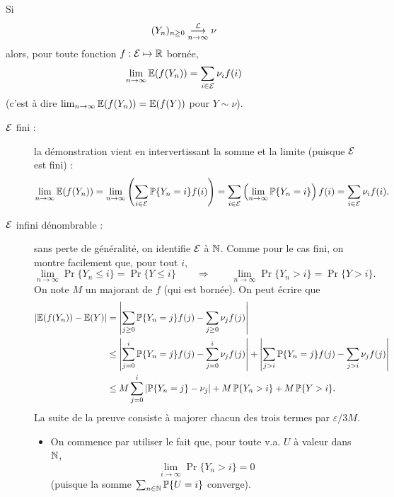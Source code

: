 \begin{proposition} \label{prop:convergenceEsperance}
  Si
  $$
  (Y_n)_{n \geq 0} \overset{\mathcal{L}}{\underset{n \to \infty}{\longrightarrow}} \nu
  $$
  alors, pour toute fonction $f : \mathcal{E} \mapsto \mathbb{R}$ bornée, 
  $$
  \lim_{n \to \infty} \operatorname{\mathbb{E}}(f(Y_n)) = \sum_{i \in \mathcal{E}} \nu_i f(i)
  $$
  (c'est à dire $\lim_{n \to \infty} \operatorname{\mathbb{E}}(f(Y_n)) = \operatorname{\mathbb{E}}(f(Y))$ pour $Y \sim \nu$).
\end{proposition}

\proof 
\begin{description}
  \item[$\mathcal{E}$ fini :] la démonstration vient en intervertissant la somme et la limite (puisque $\mathcal{E}$ est fini) : 
  $$
  \lim_{n \to \infty} \operatorname{\mathbb{E}}(f(Y_n)) 
  = \lim_{n \to \infty} \left(\sum_{i \in \mathcal{E}} \operatorname{\mathbb{P}}\{Y_n = i\} f(i)\right)
  = \sum_{i \in \mathcal{E}} \left(\lim_{n \to \infty} \operatorname{\mathbb{P}}\{Y_n = i\} \right) f(i) 
  = \sum_{i \in \mathcal{E}} \nu_i f(i).
  $$
  \item[$\mathcal{E}$ infini dénombrable :] sans perte de généralité, on identifie $\mathcal{E}$ à $\mathbb{N}$. Comme pour le cas fini, on montre facilement que, pour tout $i$,
  $$
  \lim_{n \to \infty} \Pr\{Y_n \leq i\} = \Pr\{Y \leq i\}
  \qquad \Rightarrow \qquad 
  \lim_{n \to \infty} \Pr\{Y_n > i\} = \Pr\{Y > i\}.
  $$
  On note $M$ un majorant de $f$ (qui est bornée). On peut écrire que
  \begin{align*}
    \left|\operatorname{\mathbb{E}}(f(Y_n)) - \operatorname{\mathbb{E}}(Y)\right|
    & = \left|\sum_{j \geq 0} \operatorname{\mathbb{P}}\{Y_n=j\} f(j) - \sum_{j \geq 0} \nu_j f(j)\right| \\
    & \leq \left|\sum_{j=0}^i \operatorname{\mathbb{P}}\{Y_n=j\} f(j) - \sum_{j=0}^i \nu_j f(j)\right|
    + \left|\sum_{j > i} \operatorname{\mathbb{P}}\{Y_n=j\} f(j) - \sum_{j > i} \nu_j f(j)\right| \\
    & \leq M \sum_{j=0}^i \left|\operatorname{\mathbb{P}}\{Y_n=j\} - \nu_j\right| + M \operatorname{\mathbb{P}}\{Y_n > i\} + M \operatorname{\mathbb{P}}\{Y > i\}.
  \end{align*}
  La suite de la preuve consiste à majorer chacun des trois termes par $\varepsilon/3M$. 
  \begin{itemize}
  \item On commence par utiliser le fait que, pour toute v.a. $U$ à valeur dans $\mathbb{N}$, 
  $$
  \lim_{i \to \infty} \Pr\{Y_n > i\} = 0
  $$
  (puisque la somme $\sum_{n \in \mathbb{N}} \operatorname{\mathbb{P}}\{U = i\}$ converge). \\

\end{itemize}
\end{description}

